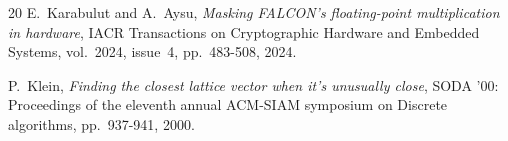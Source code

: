 \documentclass{llncs}
\begin{document}
\begin{thebibliography}{20}
E.~Karabulut and A.~Aysu,
\emph{Masking FALCON’s floating-point multiplication in hardware},
IACR Transactions on Cryptographic Hardware and Embedded Systems,
vol.~2024, issue~4, pp.~483-508, 2024.



P.~Klein,
\emph{Finding the closest lattice vector when it’s unusually close},
SODA '00: Proceedings of the eleventh annual ACM-SIAM symposium on
Discrete algorithms, pp.~937-941, 2000.








\end{thebibliography}
\end{document}
